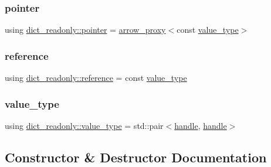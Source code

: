 \mbox{\label{classdict__readonly_a5d2c6399a70096d2e7b3004939b7c685}} 
\subsubsection{\texorpdfstring{pointer}{pointer}}
{\footnotesize\ttfamily using \mbox{\hyperlink{classdict__readonly_a5d2c6399a70096d2e7b3004939b7c685}{dict\+\_\+readonly\+::pointer}} =  \mbox{\hyperlink{structarrow__proxy}{arrow\+\_\+proxy}}$<$const \mbox{\hyperlink{classdict__readonly_a127806c5f2c38bfb96bb8dcbc5045734}{value\+\_\+type}}$>$\hspace{0.3cm}{\ttfamily [protected]}}

\mbox{\label{classdict__readonly_a84d59082eaadc1ea6eb819992cc74f0e}} 
\subsubsection{\texorpdfstring{reference}{reference}}
{\footnotesize\ttfamily using \mbox{\hyperlink{classdict__readonly_a84d59082eaadc1ea6eb819992cc74f0e}{dict\+\_\+readonly\+::reference}} =  const \mbox{\hyperlink{classdict__readonly_a127806c5f2c38bfb96bb8dcbc5045734}{value\+\_\+type}}\hspace{0.3cm}{\ttfamily [protected]}}

\mbox{\label{classdict__readonly_a127806c5f2c38bfb96bb8dcbc5045734}} 
\subsubsection{\texorpdfstring{value\_type}{value\_type}}
{\footnotesize\ttfamily using \mbox{\hyperlink{classdict__readonly_a127806c5f2c38bfb96bb8dcbc5045734}{dict\+\_\+readonly\+::value\+\_\+type}} =  std\+::pair$<$\mbox{\hyperlink{classhandle}{handle}}, \mbox{\hyperlink{classhandle}{handle}}$>$\hspace{0.3cm}{\ttfamily [protected]}}



\subsection{Constructor \& Destructor Documentation}
\mbox{\label{classdict__readonly_a52c3ca198cb013e3ba952950d6ee95de}} 
